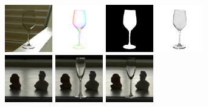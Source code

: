     \includegraphics[width=0.155\textwidth]{ch-tomnet/images/Limitation/natural_29_029_IMG_5058crop_5_final_r.jpg}
    \includegraphics[width=0.155\textwidth]{ch-tomnet/images/Limitation/natural_29_029_IMG_5058crop_1_fcolor_r.jpg}
    \includegraphics[width=0.155\textwidth]{ch-tomnet/images/Limitation/natural_29_029_IMG_5058crop_3_mask_r.jpg}
    \includegraphics[width=0.155\textwidth]{ch-tomnet/images/Limitation/natural_29_029_IMG_5058crop_4_rho_r.jpg}
\\
    \includegraphics[width=0.155\textwidth]{ch-tomnet/images/Limitation/natural_57_057_IMG_5084crop_0_ref.jpg}
    \includegraphics[width=0.155\textwidth]{ch-tomnet/images/Limitation/natural_57_057_IMG_5084crop_7_tar.jpg}
    \includegraphics[width=0.155\textwidth]{ch-tomnet/images/Limitation/natural_57_057_IMG_5084crop_5_final_r.jpg}

